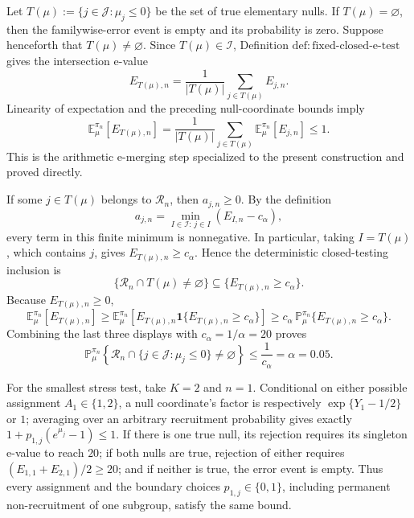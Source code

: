 Let \(T(\mu):=\{j\in\mathcal J:\mu_j\leq0\}\) be the set of true elementary nulls.  If \(T(\mu)=\varnothing\), then the familywise-error event is empty and its probability is zero.  Suppose henceforth that \(T(\mu)\neq\varnothing\).  Since \(T(\mu)\in\mathcal I\), Definition \(\mathrm{def:fixed\text{-}closed\text{-}e\text{-}test}\) gives the intersection e-value
\[
E_{T(\mu),n}=\frac{1}{|T(\mu)|}\sum_{j\in T(\mu)}E_{j,n}.
\]
Linearity of expectation and the preceding null-coordinate bounds imply
\[
\mathbb E_\mu^{\pi_n}[E_{T(\mu),n}]
=\frac{1}{|T(\mu)|}\sum_{j\in T(\mu)}
 \mathbb E_\mu^{\pi_n}[E_{j,n}]
\leq1.
\]
This is the arithmetic e-merging step specialized to the present construction and proved directly.

If some \(j\in T(\mu)\) belongs to \(\mathcal R_n\), then \(a_{j,n}\geq0\).  By the definition
\[
a_{j,n}=\min_{I\in\mathcal I:\,j\in I}(E_{I,n}-c_\alpha),
\]
every term in this finite minimum is nonnegative.  In particular, taking \(I=T(\mu)\), which contains \(j\), gives \(E_{T(\mu),n}\geq c_\alpha\).  Hence the deterministic closed-testing inclusion is
\[
\{\mathcal R_n\cap T(\mu)\neq\varnothing\}
\subseteq\{E_{T(\mu),n}\geq c_\alpha\}.
\]
Because \(E_{T(\mu),n}\geq0\),
\[
\mathbb E_\mu^{\pi_n}[E_{T(\mu),n}]
\geq
\mathbb E_\mu^{\pi_n}\!\left[E_{T(\mu),n}
 \mathbf 1\{E_{T(\mu),n}\geq c_\alpha\}\right]
\geq c_\alpha\,
\mathbb P_\mu^{\pi_n}\{E_{T(\mu),n}\geq c_\alpha\}.
\]
Combining the last three displays with \(c_\alpha=1/\alpha=20\) proves
\[
\mathbb P_\mu^{\pi_n}\!\left\{
 \mathcal R_n\cap\{j\in\mathcal J:\mu_j\leq0\}\neq\varnothing
\right\}
\leq \frac{1}{c_\alpha}=\alpha=0.05.
\]

For the smallest stress test, take \(K=2\) and \(n=1\).  Conditional on either possible assignment \(A_1\in\{1,2\}\), a null coordinate's factor is respectively \(\exp\{Y_1-1/2\}\) or \(1\); averaging over an arbitrary recruitment probability gives exactly \(1+p_{1,j}(e^{\mu_j}-1)\leq1\).  If there is one true null, its rejection requires its singleton e-value to reach \(20\); if both nulls are true, rejection of either requires \((E_{1,1}+E_{2,1})/2\geq20\); and if neither is true, the error event is empty.  Thus every assignment and the boundary choices \(p_{1,j}\in\{0,1\}\), including permanent non-recruitment of one subgroup, satisfy the same bound.
